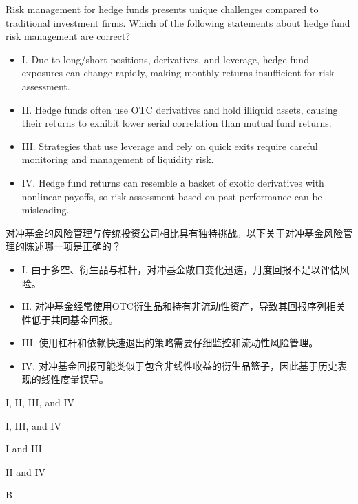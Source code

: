 \documentclass{article}
\newcounter{question} %
\begin{document}
\begin{question}
    Risk management for hedge funds presents unique challenges compared to traditional investment firms. Which of the following statements about hedge fund risk management are correct?
    \begin{itemize}
        \item I. Due to long/short positions, derivatives, and leverage, hedge fund exposures can change rapidly, making monthly returns insufficient for risk assessment.  
        \item II. Hedge funds often use OTC derivatives and hold illiquid assets, causing their returns to exhibit lower serial correlation than mutual fund returns.  
        \item III. Strategies that use leverage and rely on quick exits require careful monitoring and management of liquidity risk.  
        \item IV. Hedge fund returns can resemble a basket of exotic derivatives with nonlinear payoffs, so risk assessment based on past performance can be misleading.
    \end{itemize}
    对冲基金的风险管理与传统投资公司相比具有独特挑战。以下关于对冲基金风险管理的陈述哪一项是正确的？
    \begin{itemize}
        \item I. 由于多空、衍生品与杠杆，对冲基金敞口变化迅速，月度回报不足以评估风险。  
        \item II. 对冲基金经常使用OTC衍生品和持有非流动性资产，导致其回报序列相关性低于共同基金回报。  
        \item III. 使用杠杆和依赖快速退出的策略需要仔细监控和流动性风险管理。  
        \item IV. 对冲基金回报可能类似于包含非线性收益的衍生品篮子，因此基于历史表现的线性度量误导。
    \end{itemize}
\end{question}

\begin{choices}
    \item I, II, III, and IV
    \item I, III, and IV
    \item I and III
    \item II and IV
\end{choices}

\begin{correctanswer}
    B
\end{correctanswer}
\end{document}
